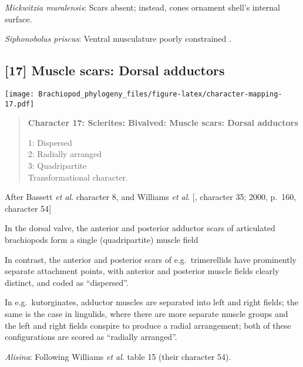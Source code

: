 \documentclass[openany]{book}
\theoremstyle{definition}
\theoremstyle{definition}
\theoremstyle{definition}
\theoremstyle{remark}
\begin{document}
\hypertarget{Mickwitzia_muralensis-coding-16}{}
\emph{Mickwitzia muralensis}: Scars absent; instead, cones ornament
shell's internal surface.

\hypertarget{Siphonobolus_priscus-coding-16}{}
\emph{Siphonobolus priscus}: Ventral musculature poorly constrained
\citep{Williams2000LinguliformeaCraniiformea, Popov2009Earlyontogeny}.

\subsection*{{[}17{]} Muscle scars: Dorsal
adductors}\label{muscle-scars-dorsal-adductors}

\texttt{[image: Brachiopod\_phylogeny\_files/figure-latex/character-mapping-17.pdf]}

\begin{quote}
\textbf{Character 17: Sclerites: Bivalved: Muscle scars: Dorsal
adductors}

1: Dispersed\\
2: Radially arranged\\
3: Quadripartite\\
Transformational character.
\end{quote}

After Bassett \emph{et al}.
\citeyearpar{Bassett2001Functionalmorphology} character 8, and Williams
\emph{et al}. {[}\citet{Williams1996Asupra}, character 35; 2000, p.~160,
character 54{]}

In the dorsal valve, the anterior and posterior adductor scars of
articulated brachiopods form a single (quadripartite) muscle field
\citep[p.~201]{Williams2000LinguliformeaCraniiformea}

In contrast, the anterior and posterior scars of e.g.~trimerellids have
prominently separate attachment points, with anterior and posterior
muscle fields clearly distinct, and coded as ``dispersed''.

In e.g.~kutorginates, adductor muscles are separated into left and right
fields; the same is the case in lingulids, where there are more separate
muscle groups and the left and right fields conspire to produce a radial
arrangement; both of these configurations are scored as ``radially
arranged''.

\hypertarget{Alisina-coding-17}{}
\emph{Alisina}: Following Williams \emph{et al}.
\citeyearpar{Williams2000LinguliformeaCraniiformea} table 15 (their
character 54).
\end{document}
